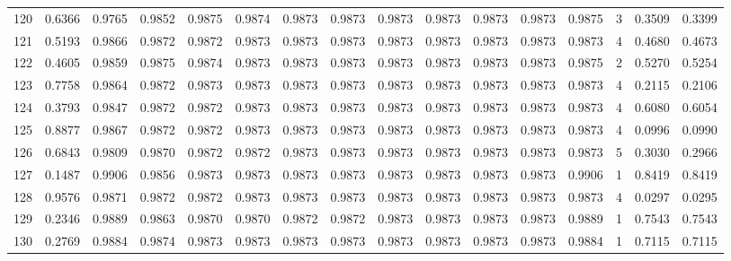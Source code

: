 \begin{tabular}{lrrrrrrrrrrrrrrr}
120 &      0.6366 &  0.9765 &  0.9852 &  0.9875 &  0.9874 &  0.9873 &  0.9873 &  0.9873 &  0.9873 &  0.9873 &   0.9873 &     0.9875 &      3 &                    0.3509 &                     0.3399 \\
121 &      0.5193 &  0.9866 &  0.9872 &  0.9872 &  0.9873 &  0.9873 &  0.9873 &  0.9873 &  0.9873 &  0.9873 &   0.9873 &     0.9873 &      4 &                    0.4680 &                     0.4673 \\
122 &      0.4605 &  0.9859 &  0.9875 &  0.9874 &  0.9873 &  0.9873 &  0.9873 &  0.9873 &  0.9873 &  0.9873 &   0.9873 &     0.9875 &      2 &                    0.5270 &                     0.5254 \\
123 &      0.7758 &  0.9864 &  0.9872 &  0.9873 &  0.9873 &  0.9873 &  0.9873 &  0.9873 &  0.9873 &  0.9873 &   0.9873 &     0.9873 &      4 &                    0.2115 &                     0.2106 \\
124 &      0.3793 &  0.9847 &  0.9872 &  0.9872 &  0.9873 &  0.9873 &  0.9873 &  0.9873 &  0.9873 &  0.9873 &   0.9873 &     0.9873 &      4 &                    0.6080 &                     0.6054 \\
125 &      0.8877 &  0.9867 &  0.9872 &  0.9872 &  0.9873 &  0.9873 &  0.9873 &  0.9873 &  0.9873 &  0.9873 &   0.9873 &     0.9873 &      4 &                    0.0996 &                     0.0990 \\
126 &      0.6843 &  0.9809 &  0.9870 &  0.9872 &  0.9872 &  0.9873 &  0.9873 &  0.9873 &  0.9873 &  0.9873 &   0.9873 &     0.9873 &      5 &                    0.3030 &                     0.2966 \\
127 &      0.1487 &  0.9906 &  0.9856 &  0.9873 &  0.9873 &  0.9873 &  0.9873 &  0.9873 &  0.9873 &  0.9873 &   0.9873 &     0.9906 &      1 &                    0.8419 &                     0.8419 \\
128 &      0.9576 &  0.9871 &  0.9872 &  0.9872 &  0.9873 &  0.9873 &  0.9873 &  0.9873 &  0.9873 &  0.9873 &   0.9873 &     0.9873 &      4 &                    0.0297 &                     0.0295 \\
129 &      0.2346 &  0.9889 &  0.9863 &  0.9870 &  0.9870 &  0.9872 &  0.9872 &  0.9873 &  0.9873 &  0.9873 &   0.9873 &     0.9889 &      1 &                    0.7543 &                     0.7543 \\
130 &      0.2769 &  0.9884 &  0.9874 &  0.9873 &  0.9873 &  0.9873 &  0.9873 &  0.9873 &  0.9873 &  0.9873 &   0.9873 &     0.9884 &      1 &                    0.7115 &                     0.7115 \\

\end{tabular}
